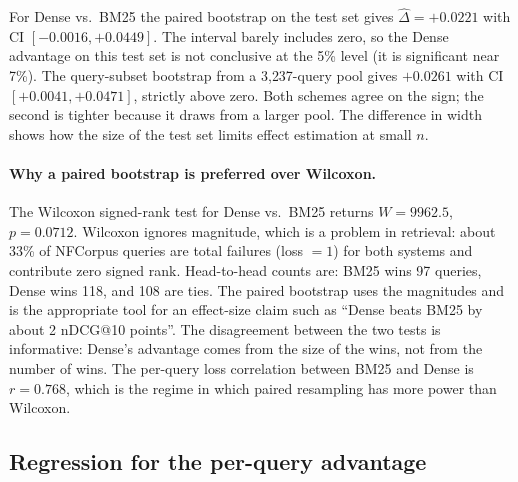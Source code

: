 \documentclass[11pt,a4paper]{article}
\begin{document}
\begin{table}[ht]
    \centering
    \caption{Paired bootstrap 95\% CI for pairwise nDCG@10 differences on
    NFCorpus. The first two rows use a paired bootstrap on the fixed
    323-query test set ($B=10{,}000$). The next two use query-subset
    resampling (2{,}000 trials of 323 queries drawn from the
    3{,}237-query union of train, dev and test). $P(A>B)$ is the share
    of resamples in which $A$ has higher mean nDCG@10 than $B$.}
    \label{tab:paired_boot}
    \small
    
\end{table}

For Dense vs.\ BM25 the paired bootstrap on the test set gives
$\hat{\Delta}=+0.0221$ with CI $[-0.0016,+0.0449]$. The interval barely
includes zero, so the Dense advantage on this test set is not
conclusive at the 5\% level (it is significant near 7\%). The
query-subset bootstrap from a 3{,}237-query pool gives $+0.0261$ with
CI $[+0.0041,+0.0471]$, strictly above zero. Both schemes agree on the
sign; the second is tighter because it draws from a larger pool. The
difference in width shows how the size of the test set limits effect
estimation at small $n$.

\paragraph{Why a paired bootstrap is preferred over Wilcoxon.}
The Wilcoxon signed-rank test for Dense vs.\ BM25 returns $W=9962.5$,
$p=0.0712$. Wilcoxon ignores magnitude, which is a problem in
retrieval: about 33\% of NFCorpus queries are total failures (loss
$=1$) for both systems and contribute zero signed rank. Head-to-head
counts are: BM25 wins 97 queries, Dense wins 118, and 108 are ties.
The paired bootstrap uses the magnitudes and is the appropriate tool
for an effect-size claim such as ``Dense beats BM25 by about 2 nDCG@10
points''. The disagreement between the two tests is informative:
Dense's advantage comes from the size of the wins, not from the number
of wins. The per-query loss correlation between BM25 and Dense is
$r = 0.768$, which is the regime in which paired resampling has more
power than Wilcoxon.

\subsection{Regression for the per-query advantage}
\label{subsec:regression}
\end{document}

